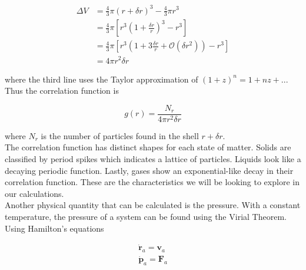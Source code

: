 \documentclass{article}
\begin{document}
\begin{multicols}{2}
\begin{equation}
\begin{split}
\Delta V & = \frac{4}{3} \pi (r+\delta r)^3 - \frac{4}{3} \pi r^3 \\
& = \frac{4}{3} \pi \left [ r^3 \left (1+\frac{\delta r}{r} \right )^3 - r^3 \right ] \\
& = \frac{4}{3} \pi \left [ r^3 \left ( 1 + 3\frac{\delta r}{r} + \mathcal{O} (\delta r ^2) \right ) - r^3 \right ] \\
& = 4 \pi r^2 \delta r
\end{split}
\end{equation}

\noindent where the third line uses the Taylor approximation of $(1+z)^n = 1 + nz+ ...$  Thus the correlation function is

\begin{equation}
g(r) = \frac{N_r}{4 \pi r^2 \delta r}
\end{equation}

\noindent where $N_r$ is the number of particles found in the shell $r + \delta r$.  \\

The correlation function has distinct shapes for each state of matter.  Solids are classified by period spikes which indicates a lattice of particles.  Liquids look like a decaying periodic function.  Lastly, gases show an exponential-like decay in their correlation function.  These are the characteristics we will be looking to explore in our calculations. \\



Another physical quantity that can be calculated is the pressure.  With a constant temperature, the pressure of a system can be found using the Virial Theorem.  Using Hamilton's equations

\begin{equation}
\begin{split}
\dot{\textbf{r}}_a = \textbf{v}_a \\
\dot{\textbf{p}}_a = \textbf{F}_a 
\end{split}
\end{equation}


\end{multicols}
\end{document}
